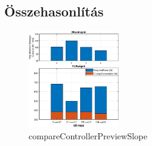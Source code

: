 \subsection{Összehasonlítás}
\begin{figure}[H]
	\centering
	\includegraphics[width=0.35\textwidth, trim=0 0 0 0, clip,]{figures/onlab/Slope/compareControllerPreviewSlope}
	\caption{compareControllerPreviewSlope}
	\label{fig:onlab-refSlprevComp}
\end{figure}


\pagebreak
